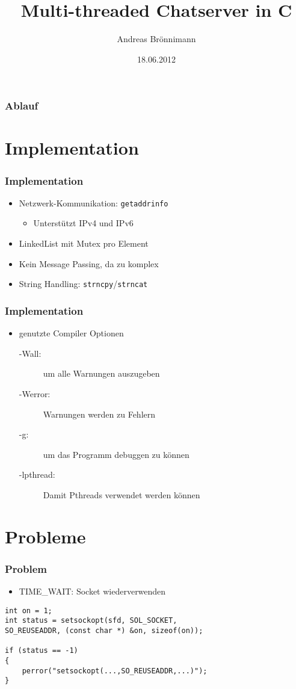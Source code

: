\documentclass[12pt]{beamer}
\title[Seminararbeit]{Multi-threaded Chatserver in C}
\author{Andreas Brönnimann}
\institute{ZHAW - Zürcher Hochschule für Angewandte Wissenschaften}
\date{18.06.2012}
\begin{document}
    \begin{frame}
        \titlepage
    \end{frame}

    \begin{frame}
        \frametitle{Ablauf}
        \tableofcontents
    \end{frame}

    \section{Implementation}
    \begin{frame}
        \frametitle{Implementation}
	    \begin{itemize}
		\item Netzwerk-Kommunikation: \texttt{getaddrinfo}
		    \begin{itemize}
			\item Unterstützt IPv4 und IPv6 
		    \end{itemize}
		\item LinkedList mit Mutex pro Element
		\item Kein Message Passing, da zu komplex
		\item String Handling: \texttt{strncpy}/\texttt{strncat}
            \end{itemize}
    \end{frame}

    \begin{frame}
    \frametitle{Implementation}
	\begin{itemize}
	    \item genutzte Compiler Optionen
		\begin{description} 
		    \item[-Wall:] um alle Warnungen auszugeben
		    \item[-Werror:] Warnungen werden zu Fehlern
		    \item[-g:] um das Programm debuggen zu können
		    \item[-lpthread:] Damit Pthreads verwendet werden können
	\end{description}

	\end{itemize}
    \end{frame}


    \section{Probleme}
    \begin{frame}[fragile]
	\frametitle{Problem}
	\begin{itemize}
	    \item TIME\_WAIT: Socket wiederverwenden
  	\end{itemize}

\begin{verbatim}
int on = 1;
int status = setsockopt(sfd, SOL_SOCKET, 
SO_REUSEADDR, (const char *) &on, sizeof(on));

if (status == -1) 
{   
    perror("setsockopt(...,SO_REUSEADDR,...)");
}
\end{verbatim}
\end{frame}
   
\end{document}
